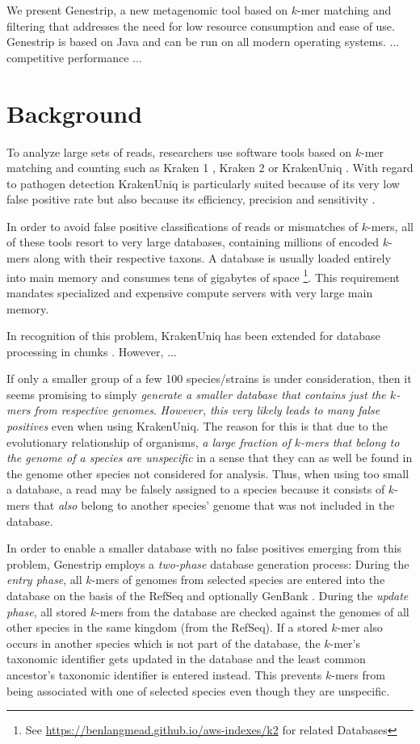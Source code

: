 \documentclass[letterpaper,11pt,leqno]{article}
\begin{document}
We present Genestrip, a new metagenomic tool based on $k$-mer matching and filtering that addresses the need for low resource consumption and ease of use. Genestrip is based on Java and can be run on all modern operating systems. ... competitive performance ...

\section{Background}\label{background}

To analyze large sets of reads, researchers use software tools based on $k$-mer matching and counting such as Kraken 1 \citep{kraken}, Kraken 2 \citep{kraken2} or KrakenUniq \citep{krakenUniq}. With regard to pathogen detection KrakenUniq is particularly suited because of its very low false positive rate but also because its efficiency, precision and sensitivity \citep{krakenUniq}.

In order to avoid false positive classifications of reads or mismatches of $k$-mers, all of these tools resort to very large databases, containing millions of encoded $k$-mers along with their respective taxons. A database is usually loaded entirely into main memory and consumes tens of gigabytes of space \footnote{See \url{https://benlangmead.github.io/aws-indexes/k2} for related Databases}. This requirement mandates specialized and expensive compute servers with very large main memory.

In recognition of this problem, KrakenUniq has been extended for database processing in chunks \citep{lowmemkraken}. However, ...

If only a smaller group of a few 100 species/strains is under consideration, then it seems promising to simply \emph{generate a smaller database that contains just the $k$-mers from respective genomes}. \emph{However, this very likely leads to many false positives} even when using KrakenUniq. The reason for this is that due to the evolutionary relationship of organisms, \emph{a large fraction of $k$-mers that belong to the genome of a species are unspecific} in a sense that they can as well be found in the genome other species not considered for analysis. Thus, when using too small a database, a read may be falsely assigned to a species because it consists of $k$-mers that \emph{also} belong to another species' genome that was not included in the database.
 
In order to enable a smaller database with no false positives emerging from this problem, Genestrip employs a \emph{two-phase} database generation process: During the \emph{entry phase}, all $k$-mers of genomes from selected species are entered into the database on the basis of the RefSeq \citep{refseq} and optionally GenBank \citep{genbank}. During the \emph{update phase}, all stored $k$-mers from the database are checked against the genomes of all other species in the same kingdom (from the RefSeq). If a stored $k$-mer also occurs in another species which is not part of the database, the $k$-mer's taxonomic identifier gets updated in the database and the least common ancestor's taxonomic identifier is entered instead. This prevents $k$-mers from being associated with one of selected species even though they are unspecific.
\end{document}
